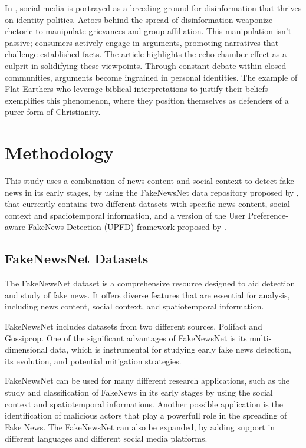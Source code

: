 \documentclass[12pt]{article}
\begin{document}
In \cite{Diaz_2023}, social media is portrayed as a breeding ground for disinformation that thrives on identity politics.
Actors behind the spread of disinformation weaponize rhetoric to manipulate grievances and group affiliation.
This manipulation isn't passive; consumers actively engage in arguments, promoting narratives that challenge established facts.
The article highlights the echo chamber effect as a culprit in solidifying these viewpoints.
Through constant debate within closed communities, arguments become ingrained in personal identities.
The example of Flat Earthers who leverage biblical interpretations to justify their beliefs exemplifies this phenomenon,
where they position themselves as defenders of a purer form of Christianity.

\section{Methodology}

This study uses a combination of news content and social context to detect fake news in its early stages, 
by using the FakeNewsNet data repository proposed by \cite{shu2019fakenewsnet}, 
that currently contains two different datasets with specific news content, social context and
spaciotemporal information, and a version of the User Preference-aware FakeNews Detection (UPFD) framework
proposed by \cite{dou2021user}.  


\subsection{FakeNewsNet Datasets}

The FakeNewsNet dataset is a comprehensive resource designed to aid detection and study of fake news. 
It offers  diverse features that are essential for analysis, including news content, social context, and spatiotemporal information. 

FakeNewsNet includes datasets from two different sources, Polifact and Gossipcop.
One of the significant advantages of FakeNewsNet is its multi-dimensional data, 
which is instrumental for studying early fake news detection, its evolution, and potential mitigation strategies. 

FakeNewsNet can be used for many different research applications, 
such as the study and classification of FakeNews in its early stages by using the social context and spatiotemporal informations.
Another possible application is the identification of malicious actors that play a powerfull role in the spreading of 
Fake News. The FakeNewsNet can also be expanded, by adding support in different languages and different social media platforms.
\end{document}
